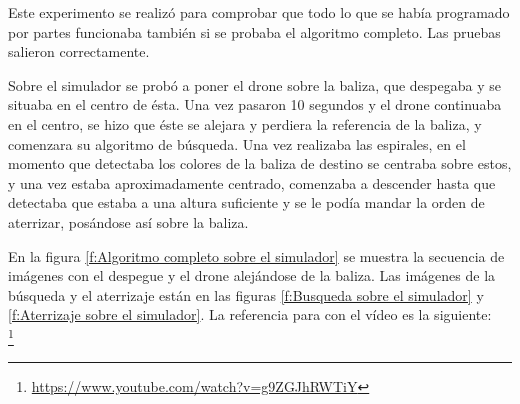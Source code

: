 \hspace{1cm} Este experimento se realiz\'o para comprobar que todo lo que se hab\'ia programado por partes funcionaba tambi\'en si se probaba el algoritmo completo. Las pruebas salieron correctamente.

\hspace{1cm} Sobre el simulador se prob\'o a poner el drone sobre la baliza, que despegaba y se situaba en el centro de \'esta. Una vez pasaron 10 segundos y el drone continuaba en el centro, se hizo que \'este se alejara y perdiera la referencia de la baliza, y comenzara su algoritmo de b\'usqueda. Una vez realizaba las espirales, en el momento que detectaba los colores de la baliza de destino se centraba sobre estos, y una vez estaba aproximadamente centrado, comenzaba a descender hasta que detectaba que estaba a una altura suficiente y se le pod\'ia mandar la orden de aterrizar, pos\'andose as\'i sobre la baliza. 

En la figura \ref{f:Algoritmo completo sobre el simulador} se muestra la secuencia de im\'agenes con el despegue y el drone alej\'andose de la baliza. Las im\'agenes de la b\'usqueda y el aterrizaje est\'an en las figuras \ref{f:Busqueda sobre el simulador} y \ref{f:Aterrizaje sobre el simulador}. La referencia para con el v\'ideo es la siguiente:\\
\footnote{\url{https://www.youtube.com/watch?v=g9ZGJhRWTiY}}


